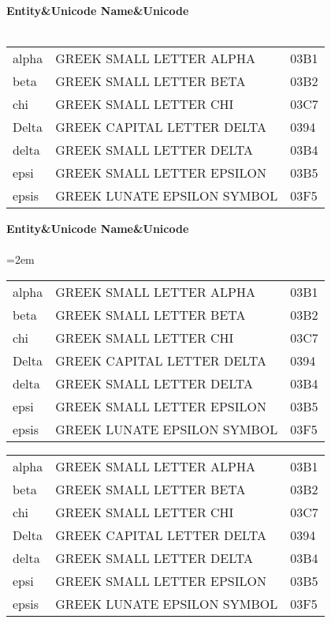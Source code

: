 \documentclass{article}
\begin{document}
\begin{table}
\tablehead
 {\bfseries Entity&\bfseries Unicode Name&\bfseries Unicode\\ \hline}
\tabletail
 {\hline {}\\}
\tablelasttail{\hline}
\begin{supertabular}{lll}
alpha  & GREEK SMALL LETTER ALPHA      & 03B1\\
beta   & GREEK SMALL LETTER BETA       & 03B2\\
chi    & GREEK SMALL LETTER CHI        & 03C7\\
Delta  & GREEK CAPITAL LETTER DELTA    & 0394\\
delta  & GREEK SMALL LETTER DELTA      & 03B4\\
epsi   & GREEK SMALL LETTER EPSILON    & 03B5\\
epsis  & GREEK LUNATE EPSILON SYMBOL   & 03F5\\
\end{supertabular}
\end{table}

\begin{table}
\tablehead
 {\bfseries Entity&\bfseries Unicode Name&\bfseries Unicode\\ \hline}
\tabletail
 {\hline {}\\}
\tablelasttail{\hline}
\tabcolsep=2em\relax
\begin{supertabular*}{\textwidth}{lll}
alpha  & GREEK SMALL LETTER ALPHA      & 03B1\\
beta   & GREEK SMALL LETTER BETA       & 03B2\\
chi    & GREEK SMALL LETTER CHI        & 03C7\\
Delta  & GREEK CAPITAL LETTER DELTA    & 0394\\
delta  & GREEK SMALL LETTER DELTA      & 03B4\\
epsi   & GREEK SMALL LETTER EPSILON    & 03B5\\
epsis  & GREEK LUNATE EPSILON SYMBOL   & 03F5\\
\end{supertabular*}
\end{table}


\begin{mpsupertabular}{lll}
alpha  & GREEK SMALL LETTER ALPHA      & 03B1\\
beta   & GREEK SMALL LETTER BETA       & 03B2\\
chi    & GREEK SMALL LETTER CHI        & 03C7\\
Delta  & GREEK CAPITAL LETTER DELTA    & 0394\\
delta  & GREEK SMALL LETTER DELTA      & 03B4\\
epsi   & GREEK SMALL LETTER EPSILON    & 03B5\\
epsis  & GREEK LUNATE EPSILON SYMBOL   & 03F5\\
\end{mpsupertabular}
\end{document}
